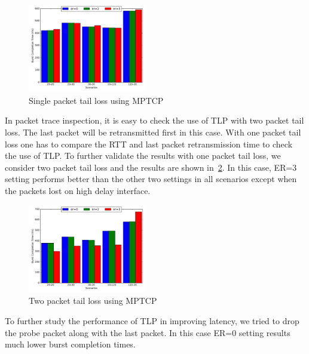 \documentclass[10pt,draftcls,twocolumn]{IEEEconf}
\begin{document}
\begin{figure}[!ht]
\begin{center}
\includegraphics[angle=0, width=0.46\textwidth,natwidth=578.16,natheight=433.62]{plots/1P.pdf}
\caption{Single packet tail loss using MPTCP}\label{1p}
\end{center}
\end{figure}

In packet trace inspection, it is easy to check the use of TLP with two packet tail loss. The last packet will be retransmitted first in this case.
With one packet tail loss one has to compare the RTT and last packet retransmission time to check the use of TLP.
To further validate the results with one packet tail loss, we consider two packet tail loss and the results are shown in~\ref{2p}.
In this case, ER=3 setting performs better than the other two settings in all scenarios except when the packets lost on high delay interface. 


\begin{figure}[!ht]
\begin{center}
\includegraphics[angle=0, width=0.46\textwidth,natwidth=578.16,natheight=433.62]{plots/2P.pdf}
\caption{Two packet tail loss using MPTCP}\label{2p}
\end{center}
\end{figure}

To further study the performance of TLP in improving latency, we tried to drop the probe packet along with the last packet. In this case ER=0
setting results much lower burst completion times. 
\end{document}
